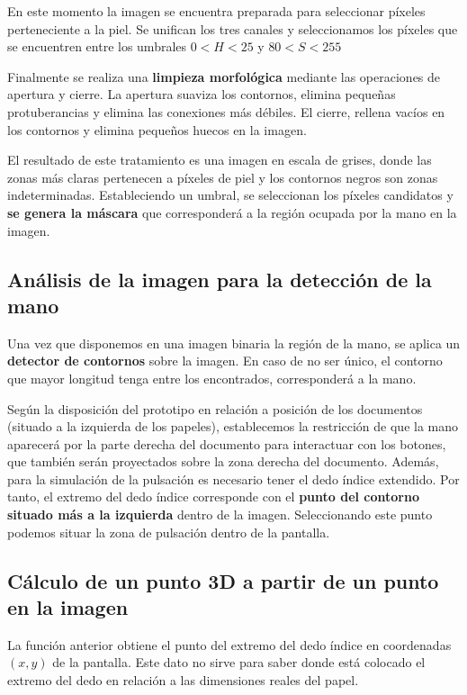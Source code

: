 En este momento la imagen se encuentra preparada para seleccionar
píxeles perteneciente a la piel. Se unifican los tres canales y
seleccionamos los píxeles que se encuentren entre los umbrales
$0 < H < 25$ y $80 < S < 255$

Finalmente se realiza una \textbf{limpieza morfológica} mediante las operaciones de
apertura y cierre. La apertura suaviza los contornos, elimina pequeñas
protuberancias y elimina las conexiones más débiles. El cierre,
rellena vacíos en los contornos y elimina pequeños huecos en la
imagen.

El resultado de este tratamiento es una imagen en escala de grises,
donde las zonas más claras pertenecen a píxeles de piel y los
contornos negros son zonas indeterminadas. Estableciendo un umbral, se
seleccionan los píxeles candidatos y \textbf{se genera la máscara} que
corresponderá a la región ocupada por la mano en la imagen.

\subsection{Análisis de la imagen para la detección de la mano}
Una vez que disponemos en una imagen binaria la región de la mano,
se aplica un \textbf{detector de contornos} sobre la imagen. En caso de no ser
único, el contorno que mayor longitud tenga entre los encontrados, corresponderá
a la mano.

Según la disposición del prototipo en relación a posición de los
documentos (situado a la izquierda de los papeles), establecemos la restricción de que la mano aparecerá por
la parte derecha del documento para interactuar con los botones, que
también serán proyectados sobre la zona derecha del documento. Además,
para la simulación de la pulsación es necesario tener el dedo índice
extendido. Por tanto, el extremo del dedo índice corresponde con el
 \textbf{punto del contorno situado más a la izquierda} dentro de la
imagen. Seleccionando este punto podemos situar la zona de pulsación
dentro de la pantalla.

\subsection{Cálculo de un punto 3D a partir de un punto en la imagen}
La función anterior obtiene el punto del extremo del dedo índice en
coordenadas $(x,y)$ de la pantalla. Este dato no sirve para saber
donde está colocado el extremo del dedo en relación a las
dimensiones reales del papel.

